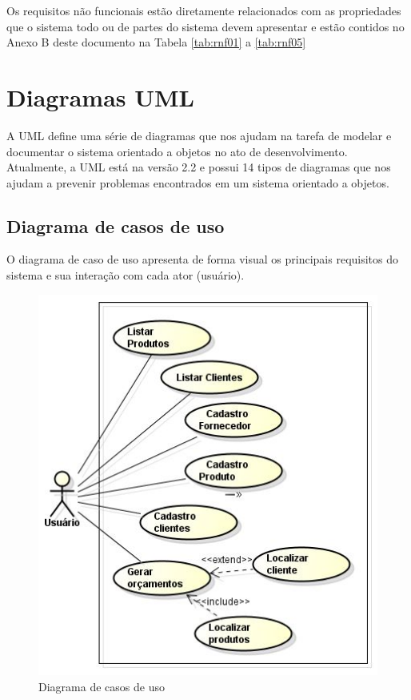Os requisitos não funcionais estão diretamente relacionados com as propriedades que o sistema todo ou de partes do sistema devem apresentar e estão contidos no Anexo B deste documento na Tabela \ref{tab:rnf01} a \ref{tab:rnf05}


\section{Diagramas UML}

A UML define uma série de diagramas que nos ajudam na tarefa de modelar e documentar o sistema orientado a objetos no ato de desenvolvimento. Atualmente, a UML está na versão 2.2 e possui 14 tipos de diagramas que nos ajudam a prevenir problemas encontrados em um sistema orientado a objetos. 

\subsection{Diagrama de casos de uso}
O diagrama de caso de uso apresenta de forma visual os principais requisitos do sistema e sua interação com cada ator (usuário).

\begin{figure}[htp]
\centering
\caption{Diagrama de casos de uso}
\label{fig:Casodeuso}
\includegraphics[width=13cm]{imagens/Caso-de-uso-}
\end{figure}

